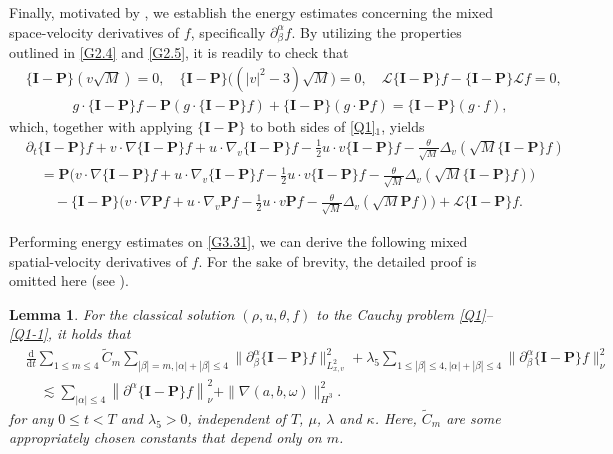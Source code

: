 \documentclass[reqno,11pt]{amsart}
\theoremstyle{plain}
\newtheorem{lem}[thm]{Lemma}
\numberwithin{equation}{section}
\begin{document}
Finally, motivated by \cite{DFT-2010-CMP,GY-iumj-2004,LMW-SIAM-2017}, we establish the energy estimates concerning the mixed space-velocity derivatives of $f$, specifically $\partial_\beta^\alpha f$. By utilizing the properties outlined in \eqref{G2.4} and \eqref{G2.5}, it is readily to check that  
\begin{align*}
& \{\mathbf{I}-\mathbf{P}\}(v \sqrt{M})=0,  
\quad\{\mathbf{I}-\mathbf{P}\}   \big((|v|^2-3 ) \sqrt{M} \big)= 0, \quad
\mathcal{L}\{\mathbf{I}-\mathbf{P}\} f-\{\mathbf{I}-\mathbf{P}\} \mathcal{L} f= 0,\\
&\quad\quad\quad\,\,   g \cdot\{\mathbf{I}-\mathbf{P}\} f-\mathbf{P}(g \cdot\{\mathbf{I}-\mathbf{P}\} f)+\{\mathbf{I}-\mathbf{P}\}(g \cdot \mathbf{P} f)= \{\mathbf{I}-\mathbf{P}\}(g \cdot f),
\end{align*}
 which, together with applying $\{\mathbf{I}-\mathbf{P}\}$ to both sides of \eqref{Q1}$_1$, yields 
\begin{align}\label{G3.31}
&\partial_t\{\mathbf{I} -\mathbf{P}\} f+v \cdot \nabla\{\mathbf{I}-\mathbf{P}\} f+u \cdot \nabla_v\{\mathbf{I}-\mathbf{P}\} f-\frac{1}{2} u \cdot v\{\mathbf{I}-\mathbf{P}\} f-\frac{\theta }{\sqrt{M}} \Delta_v (\sqrt{M}\{\mathbf{I}-\mathbf{P}\} f ) \nonumber\\
&\quad = \mathbf{P}\Big(v \cdot \nabla\{\mathbf{I}-\mathbf{P}\} f+u \cdot \nabla_v\{\mathbf{I}-\mathbf{P}\} f-\frac{1}{2} u \cdot v\{\mathbf{I}-\mathbf{P}\} f -\frac{\theta}{\sqrt{M}} \Delta_v(\sqrt{M}\{\mathbf{I}-\mathbf{P}\} f)\Big) \nonumber\\
&\quad\quad-\{\mathbf{I}-\mathbf{P}\}\Big(v \cdot \nabla \mathbf{P} f+u \cdot \nabla_v \mathbf{P} f -\frac{1}{2} u \cdot v \mathbf{P} f-\frac{\theta }{\sqrt{M}} \Delta_v(\sqrt{M} \mathbf{P} f)\Big)+\mathcal{L}\{\mathbf{I}-\mathbf{P}\} f.
\end{align}

Performing energy estimates on \eqref{G3.31}, we can derive the following mixed spatial-velocity derivatives of $f$. For the sake of brevity, the detailed proof is omitted here (see \cite{LNW-arXiv-2025,Mu-Wang-20}).
\begin{lem}\label{L3.5}
For the  classical solution $(\rho, u,\theta,f)$ to the Cauchy problem \eqref{Q1}--\eqref{Q1-1}, it holds that 
\begin{align}\label{G3.32}
& \frac{\mathrm{d}}{\mathrm{d} t} \sum_{1 \leq m \leq 4} \tilde C_m \sum_{ {|\beta|=m ,
|\alpha|+|\beta| \leq 4}} \|\partial_\beta^\alpha\{\mathbf{I}-\mathbf{P}\} f \|_{L_{x,v}^2}^2+\lambda_5 \sum_{ {1 \leq|\beta| \leq 4,
|\alpha|+|\beta| \leq 4}} \|\partial_\beta^\alpha\{\mathbf{I}-\mathbf{P}\} f \|_\nu^2\nonumber \\
&\quad \lesssim \sum_{\left|\alpha\right| \leq 4}\left\|\partial^{\alpha}\{\mathbf{I}-\mathbf{P}\} f\right\|_\nu^2+ \|\nabla(a,b,\omega)\|_{H^3}^2.
\end{align}
for any $0 \leq t < T$ and $\lambda_5>0$, independent of  $T$, $\mu$, $\lambda$ and $\kappa$.  
Here, $\tilde C_m$ are some appropriately chosen constants that depend  only on $m$.  
\end{lem}
\end{document}
